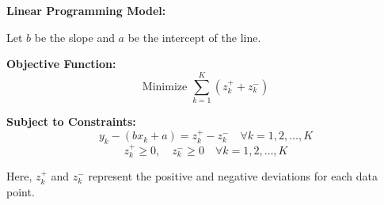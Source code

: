 \documentclass{article}
\begin{document}
\textbf{Linear Programming Model:}

Let \( b \) be the slope and \( a \) be the intercept of the line.

\textbf{Objective Function:}
\[
\text{Minimize } \sum_{k=1}^{K} (z_k^+ + z_k^-)
\]

\textbf{Subject to Constraints:}
\[
y_k - (bx_k + a) = z_k^+ - z_k^- \quad \forall k = 1, 2, \ldots, K
\]
\[
z_k^+ \geq 0, \quad z_k^- \geq 0 \quad \forall k = 1, 2, \ldots, K
\]

Here, \( z_k^+ \) and \( z_k^- \) represent the positive and negative deviations for each data point.
\end{document}
